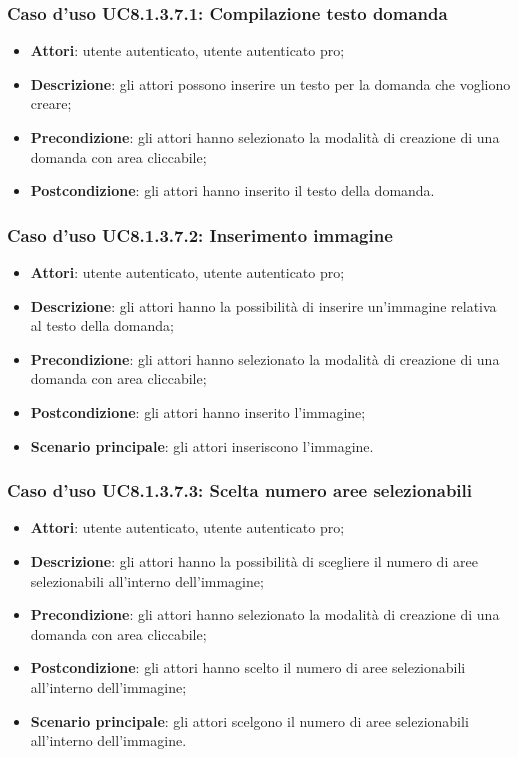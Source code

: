 \subsubsection{Caso d'uso UC8.1.3.7.1: Compilazione testo domanda}
\begin{itemize}
	\item \textbf{Attori}: utente autenticato, utente autenticato pro;
	\item \textbf{Descrizione}: gli attori possono inserire un testo per la domanda che vogliono creare;
	\item \textbf{Precondizione}: gli attori hanno selezionato la modalità di creazione di una domanda con area cliccabile;
	\item \textbf{Postcondizione}: gli attori hanno inserito il testo della domanda.
\end{itemize}

\subsubsection{Caso d'uso UC8.1.3.7.2: Inserimento immagine}
\begin{itemize}
	\item \textbf{Attori}: utente autenticato, utente autenticato pro;
	\item \textbf{Descrizione}: gli attori hanno la possibilità di inserire un'immagine relativa al testo della domanda;
	\item \textbf{Precondizione}: gli attori hanno selezionato la modalità di creazione di una domanda con area cliccabile; 
	\item \textbf{Postcondizione}: gli attori hanno inserito l'immagine;
	\item \textbf{Scenario principale}: gli attori inseriscono l'immagine. 	
\end{itemize}

\subsubsection{Caso d'uso UC8.1.3.7.3: Scelta numero aree selezionabili}
\begin{itemize}
	\item \textbf{Attori}: utente autenticato, utente autenticato pro;
	\item \textbf{Descrizione}: gli attori hanno la possibilità di scegliere il numero di aree selezionabili all'interno dell'immagine;
	\item \textbf{Precondizione}: gli attori hanno selezionato la modalità di creazione di una domanda con area cliccabile; 
	\item \textbf{Postcondizione}: gli attori hanno scelto il numero di aree selezionabili all'interno dell'immagine;
	\item \textbf{Scenario principale}: gli attori scelgono il numero di aree selezionabili all'interno dell'immagine. 	
\end{itemize}

